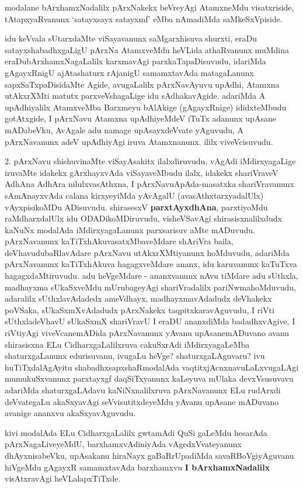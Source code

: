 \centerline{}

\centerline{}

\begin{artha}
modalane bArxhamxNadalilx pArxNakekx beVreyAgi AtamxneMdu
visatxriside, tAtapxyaR\-vanunx `satayxsayx satayxmf' eMba nAmadiMda
saMkeSxVpiside. 

idu keVvala sUtarxdaMte viSayavanunx saMgarxhisuva shurxti, eraDu
satayxshabadhx\-gaLigU pArxNa AtamxveMdu heVLida athaRvanunx muMdina
eraDubArxhamxNagaLalilx karxmavAgi parxkaTapaDisuvudu, idariMda
gAgayxRnigU ajAtashaturx rAjanigU samamxtavAda matagaLanunx
sapxSaTxpaDisidaMte Agide, avugaLalilx pArxNavAyuvu upAdhi, Atamxna
utAkxrXMti matutx parxveVshagaLige idu sAdhakavAgide. adariMda A
upAdhiyalilx AtamxveMba Barxmeyu bAlAkige (gAgayxRnige) ididxteMbudu
gotAtxgide, I pArxNavu Atamxna upAdhiyeMdeV iTuTx adanunx upAsane
mADabeVku, AvAgale adu namage upAsayxdeVvate yAguvudu, A pArxNavanunx
adeV upAdhiyAgi iruva Atamxnanunx. ililx viveVcisuvudu.
\end{artha}


\centerline{}

\begin{artha}
2. pArxNavu shishuvinaMte viSayAsakitx ilalxdiruvudu, vAgAdi
iMdirxya\-gaLige iruvaMte idakekx gArxhayxvAda viSayaveMbudu ilalx,
idakekx shariVraveV AdhAna \break AdhAra nilulxvasAthxna, I pArxNavuApAda-masatxka shariVravanunx sAmAnayxvAda calana kirxyeyiMda
yAvAgalU (avasAthxtarxyadalUlx) vAyxpisikoMDu ADisuvudu. \-shirasesxV
\textbf{parxtAyxdhAna}, parxtiyoMdu raMdharxdalUlx idu ODADikoMDiruvudu,
visheVSa\-vAgi shirasisxnalilxdudx kaNuNx modalAda iMdirxyagaLanunx
parxsarisuv	aMte mADu\-vudu. pArxNavanunx kaTiTxhAkuvasatxMbaveMdare
shAriVra baila, deVhavudubaRlavAdare \break pArxNavu utAkxrXMtiyanunx
hoMduvudu, adariMda pArxNavanunx kaTiTxhAkuva hagagx\-veMdare ananx, idu
karuvanunx kaTuTxva hagagxdaMtiruvudu. adu heVgeMdare - ananx\-vanunx
nAvu tiMdare adu sUthxla, madhayxma sUkaSxveMdu mUrubageyAgi
shariVradalilx pariNwmahoMduvudu, adaralilx sUthxlavAdadedx ameVdhayx,
madhayxmavAdadudx \-deVhakekx poVSaka, sUkaSxmXvAdadudx pArxNakekx
taqpitxkaravAguvudu, I riVti sUthxladeVhavU  sUkaSxmX shariVravU I
eraDU ananxdiMda badadhxvAgive, I riVtiyAgi viveVcanemADida
pArxNavanunx yAvanu upAsanemADuvano avanu shirasisxna ELu
CidharxgaLalilxruva cakuSxrAdi iMdirxyagaLeMba shaturxgaLanunx
edurisuvanu, ivugaLu heVge? shaturxgaLA\-guvaru? ivu huTiTxdalAgAyitu
shabadhxsapxshaRmodalAda vaqtitxjAcnxnavuLaLxvugaLAgi \break mumukuSxvanunx
parxtayxgf daqSiTxyanunx kaLeyuva mUlaka devxVsusuvavu adariMda
shaturxgaLAdavu kaNiNxnalilxruva pArxNavanunx ELu rudArxdi deVvategaLu
akaSxyavAgi \break seVvisutitxdeyeMdu yAvanu upAsane mADuvano avanige
ananxvu akaSxya\-vAguvudu.

kivi modalAda ELu CidharxgaLalilx gwtamAdi QuSi gaLeMdu hesarAda pArxNa\-gaLiveyeMdU, barxhamxvAdiniyAda
vAgedxVvateyanunx dhAyxnisabeVku, upAsakanu hiraNayx gaBaRrUpadiMda
savaRBoVgiyAguvanu hiVgeMdu gAgayxR samamxtavAda barxhamxvu \textbf{I bArxhamxNadalilx} 
visAtxravAgi heVLalapxTiTxde.
\end{artha}

